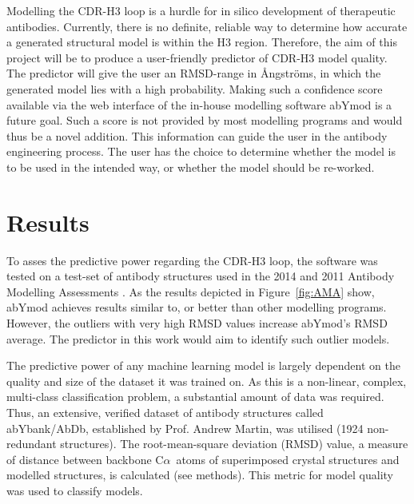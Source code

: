 \documentclass[12pt]{article}
\newcommand{\ca}{\mbox{C$\alpha$}}
\begin{document}
Modelling the CDR-H3 loop is a hurdle for in silico development of
therapeutic antibodies. Currently, there is no definite, reliable way
to determine how accurate a generated structural model is within the
H3 region. Therefore, the aim of this project will be to produce a
user-friendly predictor of CDR-H3 model quality. The predictor will give
the user an RMSD-range in {\AA}ngstr\"{o}ms, in which the generated model lies
with a high probability. Making such a confidence score available via
the web interface of the in-house modelling software abYmod is a
future goal. Such a score is not provided by most modelling programs
and would thus be a novel addition.  This information can guide the
user in the antibody engineering process. The user has the choice to
determine whether the model is to be used in the intended way, or
whether the model should be re-worked.

\section{Results}
To asses the predictive power regarding the CDR-H3 loop, the software
was tested on a test-set of antibody structures used in the 2014 and
2011 Antibody Modelling Assessments
\cite{Almagro2011,Almagro2014}. As the results depicted in
Figure~\ref{fig:AMA} show, abYmod achieves results similar to, or better than
other modelling programs. However, the outliers with very high RMSD
values increase abYmod's RMSD average. The predictor in this work
would aim to identify such outlier models.

The predictive power of any machine learning model is largely
dependent on the quality and size of the dataset it was trained on. As
this is a non-linear, complex, multi-class classification problem, a
substantial amount of data was required. Thus, an extensive, verified
dataset of antibody structures called abYbank/AbDb\cite{XXXX},
established by Prof. Andrew Martin, was utilised (1924 non-redundant
structures). The root-mean-square deviation (RMSD) value, a measure of
distance between backbone \ca\ atoms of superimposed crystal structures
and modelled structures, is calculated (see methods). This metric for
model quality was used to classify models.
\end{document}

